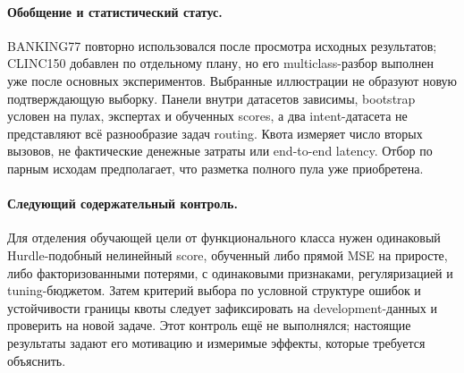\paragraph{Обобщение и статистический статус.}
BANKING77 повторно использовался после просмотра исходных результатов;
CLINC150 добавлен по отдельному плану, но его multiclass-разбор
выполнен уже после основных экспериментов. Выбранные иллюстрации
не образуют новую подтверждающую выборку. Панели внутри датасетов
зависимы, bootstrap условен на пулах, экспертах и обученных scores,
а два intent-датасета не представляют всё разнообразие задач routing.
Квота измеряет число вторых вызовов, не фактические денежные затраты
или end-to-end latency. Отбор по парным исходам предполагает,
что разметка полного пула уже приобретена.

\paragraph{Следующий содержательный контроль.}
Для отделения обучающей цели от функционального класса нужен
одинаковый Hurdle-подобный нелинейный score, обученный либо прямой MSE
на приросте, либо факторизованными потерями, с одинаковыми признаками,
регуляризацией и tuning-бюджетом. Затем критерий выбора по условной
структуре ошибок и устойчивости границы квоты следует зафиксировать
на development-данных и проверить на новой задаче. Этот контроль
ещё не выполнялся; настоящие результаты задают его мотивацию
и измеримые эффекты, которые требуется объяснить.
